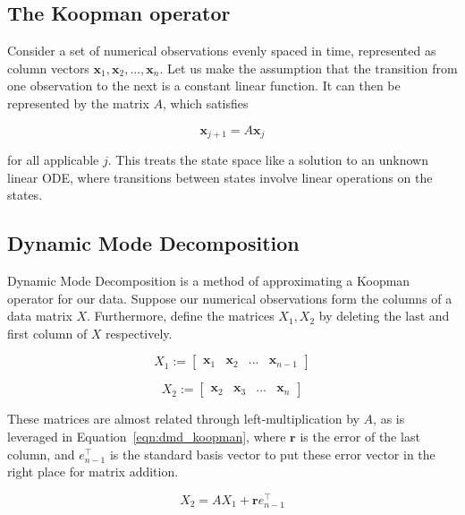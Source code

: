\documentclass{article}
\begin{document}
\subsection{The Koopman operator}
Consider a set of numerical observations evenly spaced in time, represented as column vectors $\mathbf{x}_1,\mathbf{x}_2,...,\mathbf{x}_n$. Let us make the assumption that the transition from one observation to the next is a constant linear function. It can then be represented by the matrix $A$, which satisfies

\begin{equation}
	\mathbf{x}_{j+1} = A\mathbf{x}_j
	\label{eqn:koopman}
\end{equation}

for all applicable $j$. This treats the state space like a solution to an unknown linear ODE, where transitions between states involve linear operations on the states. 

\subsection{Dynamic Mode Decomposition}
Dynamic Mode Decomposition is a method of approximating a Koopman operator for our data. Suppose our numerical observations form the columns of a data matrix $X$. Furthermore, define the matrices $X_1,X_2$ by deleting the last and first column of $X$ respectively. 

\begin{equation}
	X_1 := \begin{bmatrix}
		\mathbf{x}_1& \mathbf{x}_2 &... & \mathbf{x}_{n-1}
	\end{bmatrix}
\end{equation}

\begin{equation}
	X_2 := \begin{bmatrix}
		\mathbf{x}_2 & \mathbf{x}_3 & ... & \mathbf{x}_n
	\end{bmatrix}
\end{equation}

These matrices are almost related through left-multiplication by $A$, as is leveraged in Equation~\ref{eqn:dmd_koopman}, where $\mathbf{r}$ is the error of the last column, and $e^\top_{n-1}$ is the standard basis vector to put these error vector in the right place for matrix addition.

\begin{equation}
	X_2 = AX_1 + \mathbf{r}e^\top_{n-1}
	\label{eqn:dmd_koopman}
\end{equation}
\end{document}
